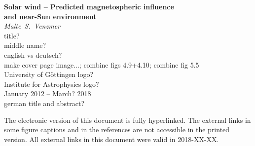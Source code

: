 \begin{titlepage}
	\begin{center}
		{\LARGE\sffamily
			\textbf{Solar wind -- Predicted magnetospheric influence\\and near-Sun environment}\\
		}
		\Large
		\textit{Malte~S.~Venzmer}\\
		title?\\
		middle name?\\
		english vs deutsch?\\
		make cover page image...; combine figs 4.9+4.10; combine fig 5.5\\
		University of Göttingen logo?\\
		Institute for Astrophysics logo?\\
		January 2012 -- March? 2018\\
		german title and abstract?\\
	\end{center}

\begin{small}
	\noindent The electronic version of this document is fully hyperlinked. The external links in some figure captions and in the references are not accessible in the printed version. All external links in this document were valid in 2018-XX-XX.
\end{small}

\vfill


\end{titlepage}
